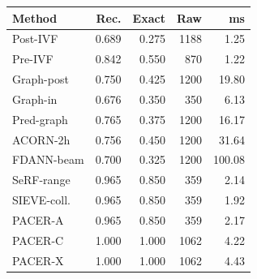\begin{tabular}{lrrrr}
\toprule
Method & Rec. & Exact & Raw & ms\\
\midrule
Post-IVF & 0.689 & 0.275 & 1188 & 1.25\\
Pre-IVF & 0.842 & 0.550 & 870 & 1.22\\
Graph-post & 0.750 & 0.425 & 1200 & 19.80\\
Graph-in & 0.676 & 0.350 & 350 & 6.13\\
Pred-graph & 0.765 & 0.375 & 1200 & 16.17\\
ACORN-2h & 0.756 & 0.450 & 1200 & 31.64\\
FDANN-beam & 0.700 & 0.325 & 1200 & 100.08\\
SeRF-range & 0.965 & 0.850 & 359 & 2.14\\
SIEVE-coll. & 0.965 & 0.850 & 359 & 1.92\\
PACER-A & 0.965 & 0.850 & 359 & 2.17\\
PACER-C & 1.000 & 1.000 & 1062 & 4.22\\
PACER-X & 1.000 & 1.000 & 1062 & 4.43\\
\bottomrule
\end{tabular}
